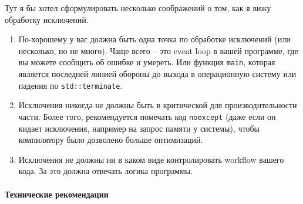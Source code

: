 Тут я бы хотел сформулировать несколько соображений о том, как я вижу обработку исключений.
\begin{enumerate}
\item По-хорошему у вас должна быть одна точка по обработке исключений (или несколько, но не много).
Чаще всего -- это event loop в вашей программе, где вы можете сообщить об ошибке и умереть.
Или функция \verb"main", которая является последней линией обороны до выхода в операционную систему или падения по \verb"std::terminate".

\item Исключения никогда не должны быть в критической для производительности части.
Более того, рекомендуется помечать код \verb"noexcept" (даже если он кидает исключения, например на запрос памяти у системы), чтобы компилятору было дозволено больше оптимизаций.

\item Исключения не должны ни в каком виде контролировать workflow вашего кода.
За это должна отвечать логика программы.
\end{enumerate}

\paragraph{Технические рекомендации}


